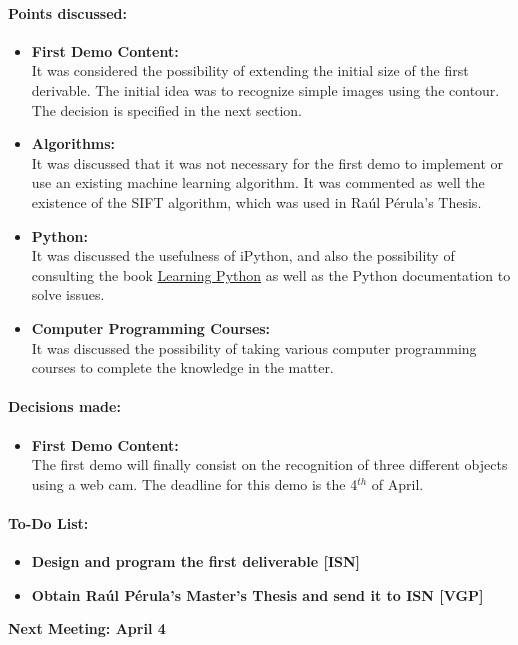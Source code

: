\documentclass{article}
\begin{document}
\paragraph{\LARGE Points discussed: }
	\begin{itemize}
		\item\textbf{First Demo Content:}\\
		It was considered the possibility of extending the initial size of the first derivable. The initial idea was to recognize simple images using the contour. The decision is specified in the next section.
		\item\textbf{Algorithms:}\\
		It was discussed that it was not necessary for the first demo to implement or use an existing machine learning algorithm. It was commented as well the existence of the SIFT algorithm, which was used in Raúl Pérula's Thesis. 
		\item\textbf{Python:}\\
		It was discussed the usefulness of iPython, and also the possibility of consulting the book \underline{Learning Python} as well as the Python documentation to solve issues.  
		\item\textbf{Computer Programming Courses:}\\
		It was discussed the possibility of taking various computer programming courses to complete the knowledge in the matter.
		
			
	\end{itemize}
	
\vspace{1cm}


\paragraph{\LARGE Decisions made:}
	\begin{itemize}
		\item\textbf{First Demo Content: }\\
			The first demo will finally consist on the recognition of three different objects using a web cam. The deadline for this demo is the 4$^{th}$ of April. 

	\end{itemize}


\vspace{1cm}
\paragraph{\LARGE To-Do List: }


	\begin{itemize}
		\item\textbf{Design and program the first deliverable [ISN]}
		\item\textbf{Obtain Raúl Pérula's Master's Thesis and send it to ISN [VGP]}
		
			
	\end{itemize}
	

\vspace{1cm}
\begin {center}
{\Large \textbf{Next Meeting: April 4}}
\end{center}
\end{document}

